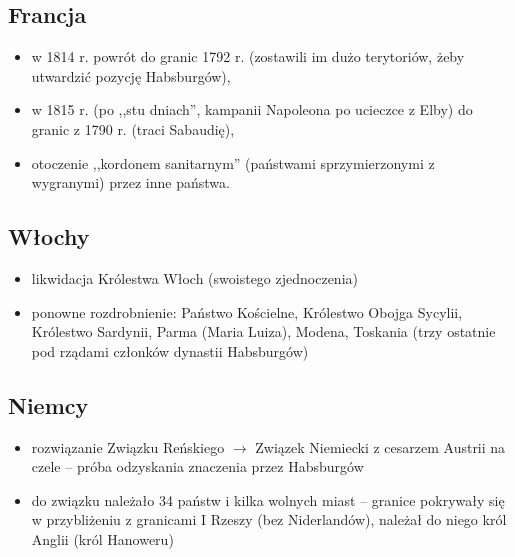 \documentclass [a4paper, 11pt, oneside]{book}
\begin{document}
        \subsection{Francja} %
        \label{sub:francja}
            \begin{itemize}
                \item w 1814 r. powrót do granic 1792 r. (zostawili im dużo terytoriów, żeby utwardzić pozycję Habsburgów),
                \item w 1815 r. (po ,,stu dniach'', kampanii Napoleona po ucieczce z Elby) do granic z 1790 r. (traci Sabaudię),
                \item otoczenie ,,kordonem sanitarnym'' (państwami sprzymierzonymi z wygranymi) przez inne państwa.
            \end{itemize}
        \subsection{Włochy} %
        \label{sub:w_ochy}
            \begin{itemize}
                \item likwidacja Królestwa Włoch (swoistego zjednoczenia)
                \item ponowne rozdrobnienie: Państwo Kościelne, Królestwo Obojga Sycylii, Królestwo Sardynii, Parma (Maria Luiza), Modena, Toskania (trzy ostatnie pod rządami członków dynastii Habsburgów)
            \end{itemize}
        \subsection{Niemcy} %
        \label{sub:niemcy}
            \begin{itemize}
                \item rozwiązanie Związku Reńskiego $\rightarrow$ Związek Niemiecki z cesarzem Austrii na czele -- próba odzyskania znaczenia przez Habsburgów
                \item do związku należało 34 państw i kilka wolnych miast -- granice pokrywały się w przybliżeniu z granicami I Rzeszy (bez Niderlandów), należał do niego król Anglii (król Hanoweru)
            \end{itemize}
\end{document}
